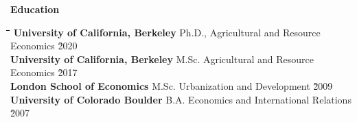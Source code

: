 \documentclass[10pt, oneside]{article}
\newcommand\mytabs{\hspace*{1cm}\=\hspace{1cm}\=\hspace{1cm}\=\hspace{1cm}\=\hspace{1cm}\=\hspace{1cm}\=\hspace{1cm}\=\hspace{1cm}\=\hspace{1cm}\=\hspace{1cm}}
\newenvironment{mysec}[1][\mytabs]
  {\begin{tabbing}#1\kill\ignorespaces}
  {\end{tabbing}}
\begin{document}
\begin{minipage}[t]{0.1\linewidth}
\textbf{Education}
\end{minipage}\hspace{0.05\linewidth}
\begin{minipage}[t]{0.8\linewidth}
\begin{mysec} 
\textbf{University of California, Berkeley} \>\>\>\>\>\> Ph.D., Agricultural and Resource Economics \`2020\\
\textbf{University of California, Berkeley} \>\>\>\>\> \>M.Sc. Agricultural and Resource Economics \`2017\\
\textbf{London School of Economics} \>\>\>\>\> \>M.Sc. Urbanization and Development \`2009\\
\textbf{University of Colorado Boulder} \>\>\>\>\>\> B.A. Economics and International Relations \`2007
\end{mysec}
\end{minipage}\vspace{5mm}
\end{document}
